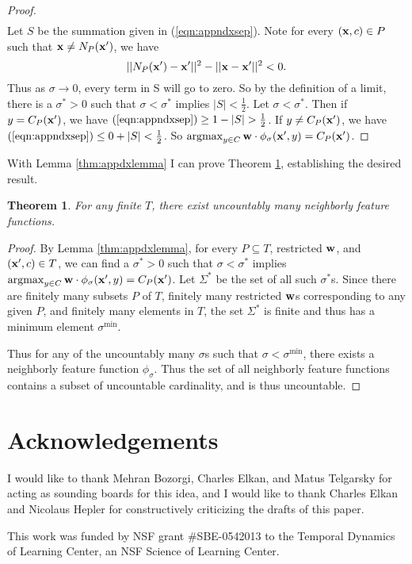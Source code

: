 \documentclass{article}
\newcommand{\argmax}{\operatornamewithlimits{argmax}}
\newtheorem{theorem}{Theorem}
\begin{document}
\begin{proof}
\begin{align}
\end{align}
Let $S$ be the summation given in (\ref{eqn:appndxsep}). Note for every $({\bf x},c) \in P$ such that ${\bf x} \neq N_P({\bf x}')$, we have
\[
||N_P({\bf x}') - {\bf x'} ||^2 - ||{\bf x} - {\bf x'} ||^2 < 0.
\]
Thus as $\sigma \rightarrow 0$, every term in S will go to zero. So by the definition of a limit, there is a $\sigma^* > 0$ such that $\sigma < \sigma^*$ implies $|S| < \frac{1}{2}$. Let $\sigma < \sigma^*$. Then if $y = C_P({\bf x}')$, we have $(\ref{eqn:appndxsep}) \geq 1 - |S| > \frac{1}{2}$. If $y \neq C_P({\bf x}')$, we have $(\ref{eqn:appndxsep}) \leq 0 + |S| < \frac{1}{2}$. So $\argmax_{y \in C} {\bf w} \cdot \phi_\sigma({\bf x}',y) = C_P({\bf x}')$.
\end{proof}

With Lemma \ref{thm:appdxlemma} I can prove Theorem \ref{thm:appdxthm}, establishing the desired result.

\begin{theorem}
\label{thm:appdxthm}
For any finite $T$, there exist uncountably many neighborly feature functions.
\end{theorem}
\begin{proof}
By Lemma \ref{thm:appdxlemma}, for every $P \subseteq T$, restricted ${\bf w}$, and $({\bf x}',c) \in T$, we can find a $\sigma^*>0$ such that $\sigma < \sigma^*$ implies $\argmax_{y \in C} {\bf w} \cdot \phi_\sigma({\bf x}',y) = C_P({\bf x}')$. Let $\Sigma^*$ be the set of all such $\sigma^*$s. Since there are finitely many subsets $P$ of $T$, finitely many restricted ${\bf w}$s corresponding to any given $P$, and finitely many elements in $T$, the set $\Sigma^*$ is finite and thus has a minimum element $\sigma^{\text{min}}$. 

Thus for any of the uncountably many $\sigma$s such that $\sigma < \sigma^{\text{min}}$, there exists a neighborly feature function $\phi_\sigma$. Thus the set of all neighborly feature functions contains a subset of uncountable cardinality, and is thus uncountable.
\end{proof}

\section*{Acknowledgements}

I would like to thank Mehran Bozorgi, Charles Elkan, and Matus Telgarsky for acting as sounding boards for this idea, and I would like to thank Charles Elkan and Nicolaus Hepler for constructively criticizing the drafts of this paper.

This work was funded by NSF grant \#SBE-0542013 to the Temporal Dynamics of Learning Center, an NSF Science of Learning Center.



\end{document}
